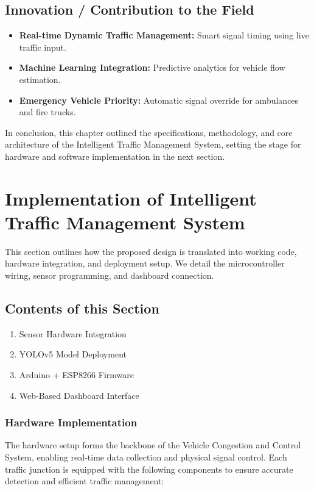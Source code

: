 \documentclass[12pt]{report}
\begin{document}
\section{Innovation / Contribution to the Field}
\begin{itemize}
\item \textbf{Real-time Dynamic Traffic Management:} Smart signal timing using live traffic input.
\item \textbf{Machine Learning Integration:} Predictive analytics for vehicle flow estimation.
\item \textbf{Emergency Vehicle Priority:} Automatic signal override for ambulances and fire trucks.
\end{itemize}

\vspace{0.5cm}
In conclusion, this chapter outlined the specifications, methodology, and core architecture of the Intelligent Traffic Management System, setting the stage for hardware and software implementation in the next section.



\chapter{Implementation of Intelligent Traffic Management System}

This section outlines how the proposed design is translated into working code, hardware integration, and deployment setup. We detail the microcontroller wiring, sensor programming, and dashboard connection.

\section{Contents of this Section}
\begin{enumerate}
\item Sensor Hardware Integration
\item YOLOv5 Model Deployment
\item Arduino + ESP8266 Firmware
\item Web-Based Dashboard Interface
\end{enumerate}

\subsection{Hardware Implementation}

The hardware setup forms the backbone of the Vehicle Congestion and Control System, enabling real-time data collection and physical signal control. Each traffic junction is equipped with the following components to ensure accurate detection and efficient traffic management:
\end{document}
